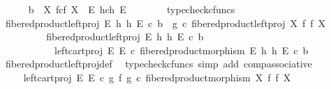 \begin{isabellebody}
\ \ \ \ \isamarkupfalse%
\ {\isachardoublequoteopen}b\ {\isacharcolon}{\kern0pt}\ X\ \isactrlbsub f\isactrlesub {\isasymtimes}\isactrlsub c\isactrlbsub f\isactrlesub \ X\ {\isasymrightarrow}\ E\ \isactrlbsub h\isactrlesub {\isasymtimes}\isactrlsub c\isactrlbsub h\isactrlesub \ E{\isachardoublequoteclose}\isanewline
\ \ \ \ \ \ \isamarkupfalse%
\ typecheck{\isacharunderscore}{\kern0pt}cfuncs\isanewline
\ \ \ \ \isamarkupfalse%
\ {\isachardoublequoteopen}fibered{\isacharunderscore}{\kern0pt}product{\isacharunderscore}{\kern0pt}left{\isacharunderscore}{\kern0pt}proj\ E\ h\ h\ E\ {\isasymcirc}\isactrlsub c\ b\ {\isacharequal}{\kern0pt}\ g\ {\isasymcirc}\isactrlsub c\ fibered{\isacharunderscore}{\kern0pt}product{\isacharunderscore}{\kern0pt}left{\isacharunderscore}{\kern0pt}proj\ X\ f\ f\ X{\isachardoublequoteclose}\isanewline
\ \ \ \ \isamarkupfalse%
\ {\isacharminus}{\kern0pt}\isanewline
\ \ \ \ \ \ \isamarkupfalse%
\ {\isachardoublequoteopen}fibered{\isacharunderscore}{\kern0pt}product{\isacharunderscore}{\kern0pt}left{\isacharunderscore}{\kern0pt}proj\ E\ h\ h\ E\ {\isasymcirc}\isactrlsub c\ b\isanewline
\ \ \ \ \ \ \ \ \ \ {\isacharequal}{\kern0pt}\ left{\isacharunderscore}{\kern0pt}cart{\isacharunderscore}{\kern0pt}proj\ E\ E\ {\isasymcirc}\isactrlsub c\ fibered{\isacharunderscore}{\kern0pt}product{\isacharunderscore}{\kern0pt}morphism\ E\ h\ h\ E\ {\isasymcirc}\isactrlsub c\ b{\isachardoublequoteclose}\isanewline
\ \ \ \ \ \ \ \ \isamarkupfalse%
\ fibered{\isacharunderscore}{\kern0pt}product{\isacharunderscore}{\kern0pt}left{\isacharunderscore}{\kern0pt}proj{\isacharunderscore}{\kern0pt}def\ \isamarkupfalse%
\ {\isacharparenleft}{\kern0pt}typecheck{\isacharunderscore}{\kern0pt}cfuncs{\isacharcomma}{\kern0pt}\ simp\ add{\isacharcolon}{\kern0pt}\ comp{\isacharunderscore}{\kern0pt}associative{}{\isacharparenright}{\kern0pt}\isanewline
\ \ \ \ \ \ \isamarkupfalse%
\ \isamarkupfalse%
\ {\isachardoublequoteopen}{\isachardot}{\kern0pt}{\isachardot}{\kern0pt}{\isachardot}{\kern0pt}\ {\isacharequal}{\kern0pt}\ left{\isacharunderscore}{\kern0pt}cart{\isacharunderscore}{\kern0pt}proj\ E\ E\ {\isasymcirc}\isactrlsub c\ {\isacharparenleft}{\kern0pt}g\ {\isasymtimes}\isactrlsub f\ g{\isacharparenright}{\kern0pt}\ {\isasymcirc}\isactrlsub c\ fibered{\isacharunderscore}{\kern0pt}product{\isacharunderscore}{\kern0pt}morphism\ X\ f\ f\ X{\isachardoublequoteclose}\isanewline
\ \ \ \ \ \ \ \ \isamarkupfalse%

\end{isabellebody}
